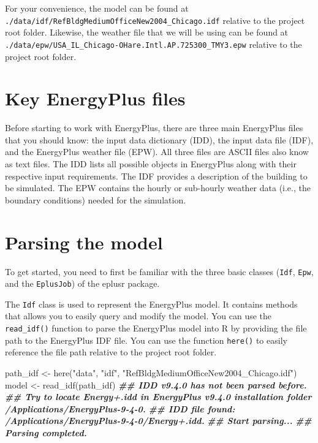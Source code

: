 \documentclass[
]{book}
\newenvironment{Shaded}{\begin{snugshade}}{\end{snugshade}}
\newcommand{\DocumentationTok}[1]{\textcolor[rgb]{0.56,0.35,0.01}{\textbf{\textit{#1}}}}
\newcommand{\FunctionTok}[1]{\textcolor[rgb]{0.00,0.00,0.00}{#1}}
\newcommand{\NormalTok}[1]{#1}
\newcommand{\OtherTok}[1]{\textcolor[rgb]{0.56,0.35,0.01}{#1}}
\newcommand{\StringTok}[1]{\textcolor[rgb]{0.31,0.60,0.02}{#1}}
\begin{document}
For your convenience, the model can be found at \texttt{./data/idf/RefBldgMediumOfficeNew2004\_Chicago.idf} relative to the project root folder. Likewise, the weather file that we will be using can be found at \texttt{./data/epw/USA\_IL\_Chicago-OHare.Intl.AP.725300\_TMY3.epw} relative to the project root folder.

\hypertarget{key-energyplus-files}{%
\section{Key EnergyPlus files}\label{key-energyplus-files}}

Before starting to work with EnergyPlus, there are three main EnergyPlus files that you should know: the input data dictionary (IDD), the input data file (IDF), and the EnergyPlus weather file (EPW). All three files are ASCII files also know as text files. The IDD lists all possible objects in EnergyPlus along with their respective input requirements. The IDF provides a description of the building to be simulated. The EPW contains the hourly or sub-hourly weather data (i.e., the boundary conditions) needed for the simulation.

\hypertarget{parsing-the-model}{%
\section{Parsing the model}\label{parsing-the-model}}

To get started, you need to first be familiar with the three basic classes (\texttt{Idf}, \texttt{Epw}, and the \texttt{EplusJob}) of the eplusr package.

The \texttt{Idf} class is used to represent the EnergyPlus model. It contains methods that allows you to easily query and modify the model. You can use the \texttt{read\_idf()} function to parse the EnergyPlus model into R by providing the file path to the EnergyPlus IDF file. You can use the function \texttt{here()} to easily reference the file path relative to the project root folder.

\begin{Shaded}
\begin{Highlighting}[]
\NormalTok{path\_idf }\OtherTok{\textless{}{-}} \FunctionTok{here}\NormalTok{(}\StringTok{"data"}\NormalTok{, }\StringTok{"idf"}\NormalTok{, }\StringTok{"RefBldgMediumOfficeNew2004\_Chicago.idf"}\NormalTok{)}
\NormalTok{model }\OtherTok{\textless{}{-}} \FunctionTok{read\_idf}\NormalTok{(path\_idf)}
\DocumentationTok{\#\# IDD v9.4.0 has not been parsed before.}
\DocumentationTok{\#\# Try to locate \textquotesingle{}Energy+.idd\textquotesingle{} in EnergyPlus v9.4.0 installation folder \textquotesingle{}/Applications/EnergyPlus{-}9{-}4{-}0\textquotesingle{}.}
\DocumentationTok{\#\# IDD file found: \textquotesingle{}/Applications/EnergyPlus{-}9{-}4{-}0/Energy+.idd\textquotesingle{}.}
\DocumentationTok{\#\# Start parsing...}
\DocumentationTok{\#\# Parsing completed.}
\end{Highlighting}
\end{Shaded}
\end{document}
